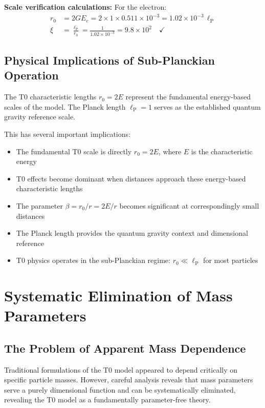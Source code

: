 \documentclass[12pt,a4paper]{report}
\newcommand{\lP}{\ell_{\text{P}}}         %
\newcommand{\rzero}{r_0}                  %
\begin{document}
\textbf{Scale verification calculations:}
For the electron:
\begin{align}
	\rzero &= 2GE_e = 2 \times 1 \times 0.511 \times 10^{-3} = 1.02 \times 10^{-3} \, \lP \\
	\xi &= \frac{\lP}{\rzero} = \frac{1}{1.02 \times 10^{-3}} = 9.8 \times 10^{2} \quad \checkmark
\end{align}

\subsection{Physical Implications of Sub-Planckian Operation}
\label{subsec:sub_planckian_implications}

The T0 characteristic lengths $\rzero = 2E$ represent the fundamental energy-based scales of the model. The Planck length $\lP = 1$ serves as the established quantum gravity reference scale.

This has several important implications:
\begin{itemize}
	\item The fundamental T0 scale is directly $\rzero = 2E$, where $E$ is the characteristic energy
	\item T0 effects become dominant when distances approach these energy-based characteristic lengths
	\item The parameter $\beta = \rzero/r = 2E/r$ becomes significant at correspondingly small distances
	\item The Planck length provides the quantum gravity context and dimensional reference
	\item T0 physics operates in the sub-Planckian regime: $\rzero \ll \lP$ for most particles
\end{itemize}

\section{Systematic Elimination of Mass Parameters}
\label{sec:mass_elimination}

\subsection{The Problem of Apparent Mass Dependence}
\label{subsec:mass_problem}

Traditional formulations of the T0 model appeared to depend critically on specific particle masses. However, careful analysis reveals that mass parameters serve a purely dimensional function and can be systematically eliminated, revealing the T0 model as a fundamentally parameter-free theory.
\end{document}
